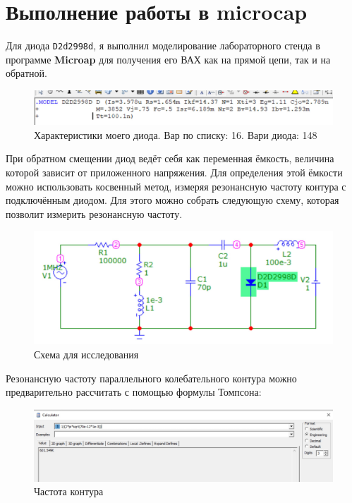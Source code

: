 \section{Выполнение работы в microcap}
Для диода \texttt{D2d2998d}, я выполнил моделирование лабораторного стенда в программе \textbf{Microap} для получения его ВАХ как на прямой цепи, так и на обратной.
\begin{figure}[H]
	\centering
	\includegraphics[width=1\textwidth]{img/02.jpg}
	\captionsetup{font=footnotesize}
	\caption{Характеристики моего диода. Вар по списку: 16. Вари диода: 148}
	\label{fig:02}
\end{figure}

При обратном смещении диод ведёт себя как переменная ёмкость, величина которой зависит от приложенного напряжения. Для определения этой ёмкости можно использовать косвенный метод, измеряя резонансную частоту контура с подключённым диодом. Для этого можно собрать следующую схему, которая позволит измерить резонансную частоту.
\begin{figure}[H]
	\centering
	\includegraphics[width=1\textwidth]{img/01.jpg}
	\captionsetup{font=footnotesize}
	\caption{Схема для исследования}
	\label{fig:01}
\end{figure}

\newpage

Резонансную частоту параллельного колебательного контура можно предварительно рассчитать с помощью формулы Томпсона:
\begin{figure}[H]
	\centering
	\includegraphics[width=1\textwidth]{img/03.jpg}
	\captionsetup{font=footnotesize}
	\caption{Частота контура}
	\label{fig:03}
\end{figure}

